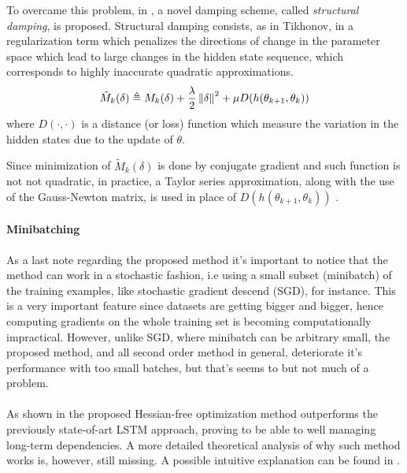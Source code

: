 To overcame this problem, in \cite{hessianFree}, a novel damping scheme, called \textit{structural damping}, is proposed.
Structural damping consists, as in Tikhonov, in a regularization term which  penalizes the directions of change in the parameter space which lead to large changes in the hidden state sequence, which corresponds to highly inaccurate quadratic approximations.
\begin{equation}
 \tilde{M}_k(\delta) \triangleq  M_k(\delta) + \frac{\lambda}{2} \left\Vert \delta \right\Vert^2 + \mu D(h(\theta_{k+1}, \theta_{k}))
\end{equation}
where $D(\cdot,\cdot)$ is a distance (or loss) function which measure the variation in the hidden states due to the update of $\theta$.

Since minimization of $\tilde{M}_k(\delta)$ is done by conjugate gradient and such function is not not quadratic, in practice, a Taylor series approximation, along with the use of the Gauss-Newton matrix, is used in place of $D(h(\theta_{k+1}, \theta_{k}))$ .

\paragraph{Minibatching}
As a last note regarding the proposed method it's important to notice that the method can work in a stochastic fashion, 
i.e using a small subset (minibatch) of the training examples, like stochastic gradient descend (SGD), for instance. This 
is a very important feature since datasets are getting bigger and bigger, hence computing gradients on the whole training 
set is becoming computationally impractical. However, unlike SGD, where minibatch can be arbitrary small, the proposed 
method, and all second order method in general, deteriorate it's performance with too small batches, but that's seems to 
but not much of a problem.
\\\\
As shown in \cite{hessianFree} the proposed Hessian-free optimization method outperforms the previously 
state-of-art LSTM\cite{lstm} approach, proving to be able to well managing long-term dependencies. A more detailed 
theoretical analysis of why such method works is, however, still missing. A possible intuitive explanation can be found 
in \cite{advancesInOptimizingRnns,pascanu}. 
